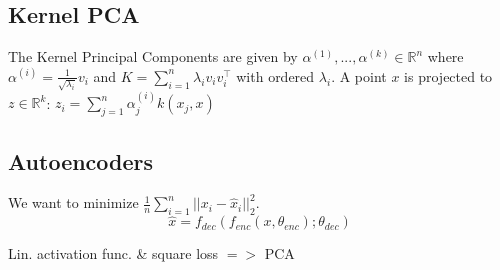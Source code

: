 \subsection*{Kernel PCA}

The Kernel Principal Components are given by $\alpha^{(1)},...,\alpha^{(k)}\in \mathbb{R}^n$ 
where $\alpha^{(i)} = \frac{1}{\sqrt{\lambda_i}}v_i$ and 
$K = \sum_{i=1}^n \lambda_i v_i v_i^\top$ with ordered $\lambda_i.$ A point 
$x$ is projected to $z \in \mathbb{R}^k$:
$z_i = \sum_{j=1}^n\alpha_j^{(i)}k(x_j,x)$

\subsection*{Autoencoders}

We want to minimize $\frac{1}{n}\sum_{i=1}^n ||x_i - \hat{x}_i||_2^2$.
$$\hat{x} = f_{dec}(f_{enc}(x, \theta_{enc}); \theta_{dec})$$

Lin. activation func. \& square loss $=>$ PCA